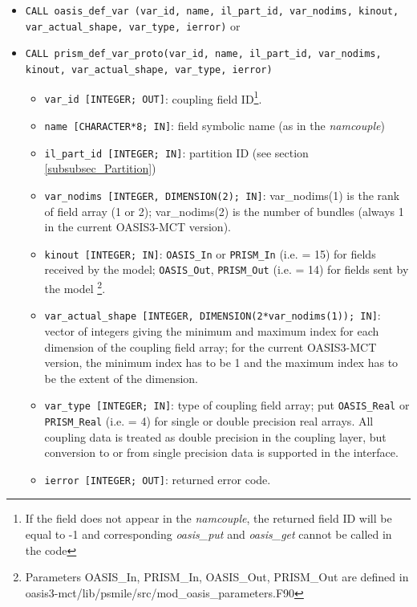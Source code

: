 \begin{itemize}

\item {\tt CALL oasis\_def\_var (var\_id, name, il\_part\_id,
    var\_nodims, kinout, \newline var\_actual\_shape, var\_type,
    ierror)} or

\item {\tt CALL prism\_def\_var\_proto(var\_id, name, il\_part\_id,
    var\_nodims, kinout, var\_actual\_shape, var\_type, ierror)}

  \begin{itemize}
  \item {\tt var\_id [INTEGER; OUT]}: coupling field ID\footnote{If
      the field does not appear in the {\it namcouple}, the returned
      field ID will be equal to -1 and corresponding {\it oasis\_put}
      and {\it oasis\_get} cannot be called in the code}.
  \item {\tt name [CHARACTER*8; IN]}: field symbolic name (as in the
    {\it namcouple})
  \item {\tt il\_part\_id [INTEGER; IN]}: partition ID (see section
    \ref{subsubsec_Partition})
  \item {\tt var\_nodims [INTEGER, DIMENSION(2); IN]}: var\_nodims(1)
    is the rank of field array (1 or 2); var\_nodims(2) is the number
    of bundles (always 1 in the current OASIS3-MCT version).
  \item {\tt kinout [INTEGER; IN]}: {\tt OASIS\_In} or {\tt PRISM\_In}
    (i.e. = 15) for fields received by the model; {\tt OASIS\_Out},
    {\tt PRISM\_Out} (i.e. = 14) for fields sent by the model
    \footnote{Parameters OASIS\_In, PRISM\_In, OASIS\_Out, PRISM\_Out
      are defined in
      oasis3-mct/lib/psmile/src/mod\_oasis\_parameters.F90}.
  \item {\tt var\_actual\_shape [INTEGER, DIMENSION(2*var\_nodims(1));
      IN]}: vector of integers giving the minimum and maximum index
    for each dimension of the coupling field array; for the current
    OASIS3-MCT version, the minimum index has to be 1 and the maximum
    index has to be the extent of the dimension.
  \item {\tt var\_type [INTEGER; IN]}: type of coupling field array;
    put {\tt OASIS\_Real} or {\tt PRISM\_Real} (i.e. = 4) for single
    or double precision real arrays.  All coupling data is treated as
    double precision in the coupling layer, but conversion to or from
    single precision data is supported in the interface.
  \item {\tt ierror [INTEGER; OUT]}: returned error code.
  \end{itemize}
\end{itemize}

